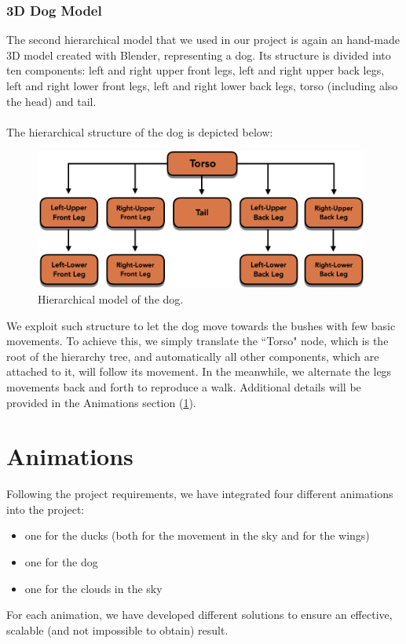 \documentclass[12pt,a4paper]{article}
\begin{document}
\subsubsection{3D Dog Model}
The second hierarchical model that we used in our project is again an hand-made 3D model created with Blender, representing a dog. Its structure is divided into ten components: left and right upper front legs, left and right upper back legs, left and right lower front legs, left and right lower back legs, torso (including also the head) and tail. 
\\\\The hierarchical structure of the dog is depicted below: 
\begin{figure}[hbt!]
	\centering
	\includegraphics[width=0.98\textwidth]{hier_dog}
	\caption{Hierarchical model of the dog.}
	\label{fig3}
\end{figure}
\hfill \break We exploit such structure to let the dog move towards the bushes with few basic movements. To achieve this, we simply translate the ``Torso" node, which is the root of the hierarchy tree, and automatically all other components, which are attached to it, will follow its movement. In the meanwhile, we alternate the legs movements back and forth to reproduce a walk. Additional details will be provided in the Animations section (\ref{anim}).

\section{Animations}\label{anim}
Following the project requirements, we have integrated four different animations into the project:
\begin{itemize}
	\item one for the ducks (both for the movement in the sky and for the wings)
	\item one for the dog
	\item one for the clouds in the sky
\end{itemize}
For each animation, we have developed different solutions to ensure an effective, scalable (and not impossible to obtain) result.	
\end{document}

